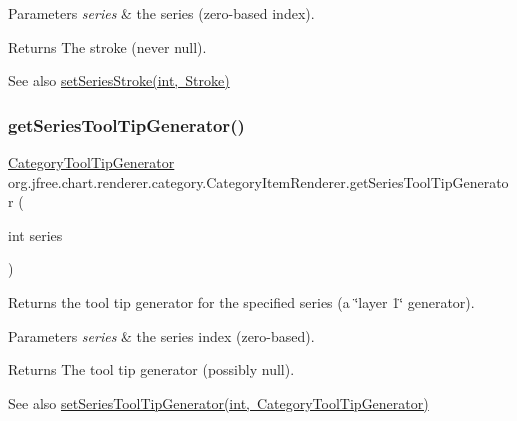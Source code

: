 \begin{DoxyParams}{Parameters}
{\em series} & the series (zero-\/based index).\\
\hline
\end{DoxyParams}
\begin{DoxyReturn}{Returns}
The stroke (never {\ttfamily null}).
\end{DoxyReturn}
\begin{DoxySeeAlso}{See also}
\mbox{\hyperlink{interfaceorg_1_1jfree_1_1chart_1_1renderer_1_1category_1_1_category_item_renderer_a8caf7dacd7b0db2b0d2c524b5cd9f84a}{set\+Series\+Stroke(int, Stroke)}} 
\end{DoxySeeAlso}
\mbox{\label{interfaceorg_1_1jfree_1_1chart_1_1renderer_1_1category_1_1_category_item_renderer_a9266001456365d0bfa851db45a7c281f}} 
\subsubsection{\texorpdfstring{get\+Series\+Tool\+Tip\+Generator()}{getSeriesToolTipGenerator()}}
{\footnotesize\ttfamily \mbox{\hyperlink{interfaceorg_1_1jfree_1_1chart_1_1labels_1_1_category_tool_tip_generator}{Category\+Tool\+Tip\+Generator}} org.\+jfree.\+chart.\+renderer.\+category.\+Category\+Item\+Renderer.\+get\+Series\+Tool\+Tip\+Generator (\begin{DoxyParamCaption}\item[{int}]{series }\end{DoxyParamCaption})}

Returns the tool tip generator for the specified series (a \char`\"{}layer 1\char`\"{} generator).


\begin{DoxyParams}{Parameters}
{\em series} & the series index (zero-\/based).\\
\hline
\end{DoxyParams}
\begin{DoxyReturn}{Returns}
The tool tip generator (possibly {\ttfamily null}).
\end{DoxyReturn}
\begin{DoxySeeAlso}{See also}
\mbox{\hyperlink{interfaceorg_1_1jfree_1_1chart_1_1renderer_1_1category_1_1_category_item_renderer_a5015519bf531ff5a7f4e165c84f192cb}{set\+Series\+Tool\+Tip\+Generator(int, Category\+Tool\+Tip\+Generator)}} 
\end{DoxySeeAlso}


